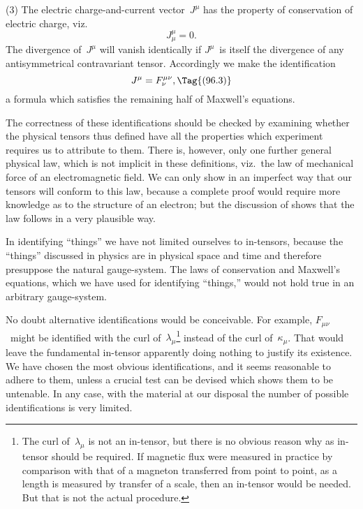 \documentclass[12pt]{book}
\begin{document}
(3) The electric charge-and-current vector~$J^{\mu}$ has the property of conservation
of electric charge, viz.\
\[
J_{\mu}^{\mu} = 0.
\]
The divergence of~$J^{\mu}$ will vanish identically if $J^{\mu}$~is itself the divergence of any
antisymmetrical contravariant tensor. Accordingly we make the identification
\[
J^{\mu} = F_{\nu}^{\mu\nu},
\Tag{(96.3)}
\]
a formula which satisfies the remaining half of Maxwell's equations.

The correctness of these identifications should be checked by examining
whether the physical tensors thus defined have all the properties which
experiment requires us to attribute to them. There is, however, only one
further general physical law, which is not implicit in these definitions, viz.\ the
law of mechanical force of an electromagnetic field. We can only show in an
imperfect way that our tensors will conform to this law, because a complete
proof would require more knowledge as to the structure of an electron; but
the discussion of \SecRef{80} shows that the law follows in a very plausible way.

In identifying ``things'' we have not limited ourselves to in-tensors,
because the ``things'' discussed in physics are in physical space and time and
therefore presuppose the natural gauge-system. The laws of conservation and
Maxwell's equations, which we have used for identifying ``things,'' would not
hold true in an arbitrary gauge-system.

No doubt alternative identifications would be conceivable. For example,
$F_{\mu\nu}$~might be identified with the curl of~$\lambda_{\mu}$\footnote
  {The curl of~$\lambda_{\mu}$ is not an in-tensor, but there is no obvious reason why as in-tensor should
  be required. If magnetic flux were measured in practice by comparison with that of a magneton
  transferred from point to point, as a length is measured by transfer of a scale, then an in-tensor
  would be needed. But that is not the actual procedure.}
instead of the curl of~$\kappa_{\mu}$. That
would leave the fundamental in-tensor apparently doing nothing to justify its
existence. We have chosen the most obvious identifications, and it seems
reasonable to adhere to them, unless a crucial test can be devised which shows
them to be untenable. In any case, with the material at our disposal the
number of possible identifications is very limited.

%
\end{document}
